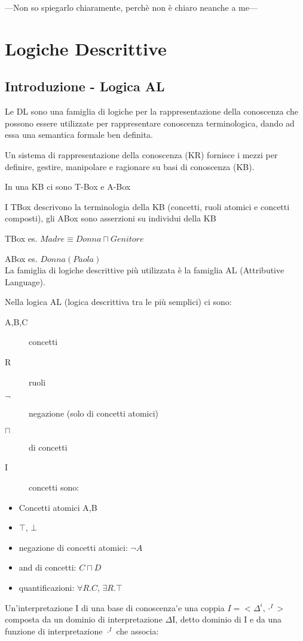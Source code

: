 \begin{savequote}[50mm]
---Non so spiegarlo chiaramente, perchè non è chiaro neanche a me---
 \end{savequote}


\chapter{Logiche Descrittive	}


\section{Introduzione - Logica AL}

Le DL sono una famiglia di logiche per la rappresentazione della conoscenza
che possono essere utilizzate per rappresentare conoscenza terminologica,
dando ad essa una semantica formale ben definita.

Un sistema di rappresentazione della conoscenza (KR) fornisce i mezzi
per definire, gestire, manipolare e ragionare su basi di conoscenza
(KB).

In una KB ci sono T-Box e A-Box

I TBox descrivono la terminologia della KB (concetti, ruoli atomici
e concetti composti), gli ABox sono asserzioni su individui della
KB

TBox es. $Madre\equiv Donna\sqcap Genitore$

ABox es. $Donna(Paola)$\\


La famiglia di logiche descrittive più utilizzata è la famiglia AL
(Attributive Language).

Nella logica AL (logica descrittiva tra le più semplici) ci sono:
\begin{description}
\item [{A,B,C}] concetti
\item [{R}] ruoli
\item [{		$\neg$}] negazione (solo di concetti atomici)
\item [{$\sqcap$}] di concetti
\item [{\textmd{I}}] concetti sono:\end{description}
\begin{itemize}
\item Concetti atomici A,B
\item $\top$, $\bot$
\item negazione di concetti atomici: $\neg A$
\item and di concetti: $C\sqcap D$
\item quantificazioni: $\forall R.C$, $\exists R.\top$
\end{itemize}
Un'interpretazione I di una base di conoscenza\'{ }e una coppia $I=<\Delta^{i},\cdot^{I}>$
composta da un dominio di interpretazione $\Delta$I, detto dominio
di I e da una funzione di interpretazione $\cdot^{I}$ che associa:

